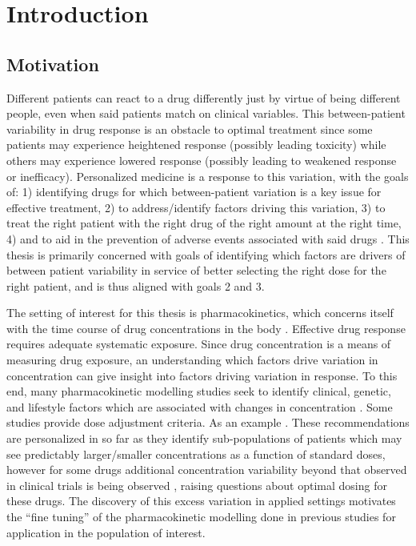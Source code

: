 \chapter{Introduction}

\section{Motivation}

Different patients can react to a drug differently just by virtue of being different people, even when said patients match on clinical variables.  This between-patient variability in drug response is an obstacle to optimal treatment since some patients may experience heightened response (possibly leading toxicity) while others may experience lowered response (possibly leading to weakened response or inefficacy).  Personalized medicine is a response to this variation, with the goals of: 1) identifying drugs for which between-patient variation is a key issue for effective treatment,  2) to address/identify factors driving this variation, 3) to treat the right patient with the right drug  of the right amount at the right time, 4) and to aid in the prevention of adverse events associated with said drugs \cite{morse2015personalized}.  This thesis is primarily concerned with goals of identifying which factors are drivers of between patient variability in service of better selecting the right dose for the right patient, and is thus aligned with goals 2 and 3.

The setting of interest for this thesis is pharmacokinetics, which concerns itself with the time course of drug concentrations in the body \cite{ rosenbaum2016basic}.
Effective drug response requires adequate systematic exposure.  Since drug concentration is a means of measuring drug exposure,  an understanding which factors drive variation in concentration can give insight into factors driving variation in response.  To this end, many pharmacokinetic modelling studies seek to identify clinical, genetic, and lifestyle factors which are associated with changes in concentration \needscite. Some studies provide dose adjustment criteria.  As an example .  These recommendations are personalized in so far as they identify sub-populations of patients which may see predictably larger/smaller concentrations as a function of standard doses, however for some drugs additional concentration variability beyond that observed in clinical trials is being observed \needscite, raising questions about optimal dosing for these drugs.  The discovery of this excess variation in applied settings motivates the ``fine tuning'' of the pharmacokinetic modelling done in previous studies for application in the population of interest.


